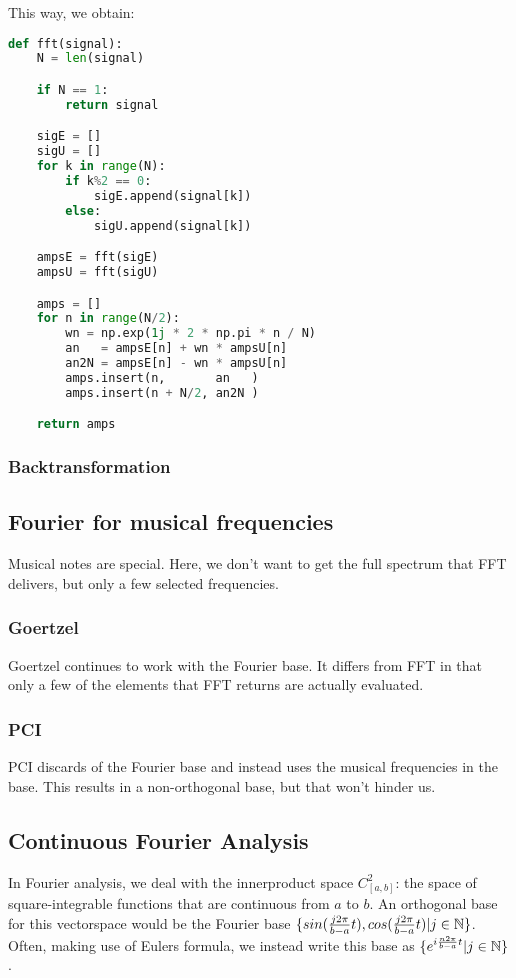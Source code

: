 This way, we obtain:
\begin{lstlisting}[language=python]
def fft(signal):
    N = len(signal)

    if N == 1:
        return signal

    sigE = []
    sigU = []
    for k in range(N):
        if k%2 == 0:
            sigE.append(signal[k])
        else:
            sigU.append(signal[k])

    ampsE = fft(sigE)
    ampsU = fft(sigU)

    amps = []
    for n in range(N/2):
        wn = np.exp(1j * 2 * np.pi * n / N)
        an   = ampsE[n] + wn * ampsU[n]
        an2N = ampsE[n] - wn * ampsU[n]
        amps.insert(n,       an   )
        amps.insert(n + N/2, an2N )

    return amps
\end{lstlisting}

\subsubsection{Backtransformation}

\subsection{Fourier for musical frequencies}
Musical notes are special. Here, we don't want to get the full spectrum that FFT delivers, but only a few selected frequencies. 
\subsubsection{Goertzel}
Goertzel continues to work with the Fourier base. It differs from FFT in that only a few of the elements that FFT returns are actually evaluated. 
\subsubsection{PCI}
PCI discards of the Fourier base and instead uses the musical frequencies in the base. This results in a non-orthogonal base, but that won't hinder us. 

\subsection{Continuous Fourier Analysis}

In Fourier analysis, we deal with the innerproduct space $C_{[a,b]}^2$: the space of square-integrable functions that are continuous from $a$ to $b$. An orthogonal base for this vectorspace would be the Fourier base $\{ sin(\frac{j 2 \pi}{b-a} t), cos(\frac{j 2 \pi}{b-a}  t) | j \in \mathbb{N} \}$. Often, making use of Eulers formula, we instead write this base as $\{ e^{i \frac{n 2 \pi}{b-a} t} | j \in \mathbb{N} \}$. 

